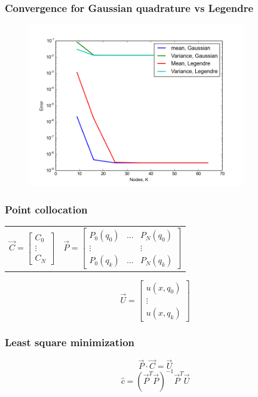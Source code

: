 \documentclass{beamer}
\begin{document}
 
 \begin{frame}
  \frametitle{Convergence for Gaussian quadrature vs Legendre}
  \begin{figure}
   \includegraphics[width=0.85\textwidth]{convergence_GvsL.png}
  \end{figure}

 \end{frame}

 
 \begin{frame}
  \frametitle{Point collocation}
  \begin{center}
 \begin{tabular}{cc}
   $\vec{C} = \left[
  \begin{matrix}
  C_0  \\
  \vdots \\
  C_N 
 \end{matrix}\right]$
 & $\vec{P} = \left[
  \begin{matrix}
  P_0(q_0) & \dots & P_N(q_0)  \\
  \vdots & & \vdots \\
  P_0(q_k) & \dots& P_N(q_k) 
 \end{matrix}\right]$
 \end{tabular}
\end{center}

\[\vec{U} = \left[
  \begin{matrix}
  u(x,q_0)  \\
  \vdots \\
  u(x,q_k) 
 \end{matrix}\right]\]
 
 \end{frame}

 
 
\begin{frame}
 \frametitle{Least square minimization}
 \[\vec{P}\cdot \vec{C}= \vec{U}\]
 \[\hat{c} = (\vec{P}^T\vec{P})^{-1}\vec{P}^T\vec{U}\]
\end{frame}
\end{document}
